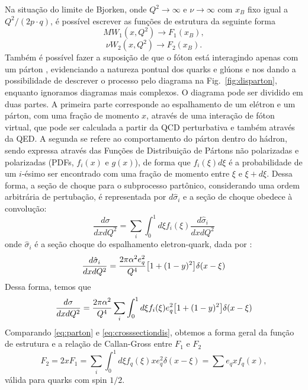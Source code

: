 Na situação do limite de Bjorken, onde \( Q^2 \rightarrow \infty \) e \( \nu \rightarrow \infty \) com \( x_B \) fixo igual a \( Q^2/(2p \cdot q) \), é possível escrever as funções de estrutura da seguinte forma
\begin{equation}
    MW_1 (x, Q^2)\rightarrow F_1(x_B),
\end{equation}
\begin{equation}
    \nu W_2(x, Q^2) \rightarrow F_2(x_B).
\end{equation}
Também é possível fazer a suposição de que o fóton está interagindo apenas com um párton \cite{bjorken_asymptotic_1969}, 
 evidenciando a natureza pontual dos quarks e glúons e nos dando a possibilidade de descrever o processo pelo diagrama na Fig.~\ref{fig:disparton}, enquanto ignoramos diagramas mais complexos. O diagrama pode ser dividido em duas partes. A primeira parte corresponde ao espalhamento de um elétron e um párton, com uma fração de momento \( x \), através  de uma interação de fóton virtual, que pode ser calculada a partir da  QCD perturbativa e também através da QED. A segunda se refere ao comportamento do párton dentro do hádron, sendo expressa através das Funções de Distribuição de Pártons não polarizadas e polarizadas (PDFs, \( f_i(x) \) e \( g(x) \)), de forma que  $f_i(\xi) d\xi$ é a probabilidade de um $i$-ésimo ser encontrado com uma fração de momento entre $\xi$ e $\xi + d\xi$. Dessa forma, a seção de choque para o subprocesso partônico, considerando uma ordem arbitrária de pertubação, é representada por $d\hat{\sigma}_i$  e a seção de choque obedece à convolução:
\begin{equation}
    \frac{d\sigma}{dxdQ^2}  = \sum_i \int^{1}_{0} d\xi f_i(\xi) \frac{d\hat{\sigma}_i}{dxdQ^2}
\end{equation}
onde $\hat{\sigma}_i$ é a seção choque do espalhamento eletron-quark, dada por :
\begin{equation}
    \frac{d\hat{\sigma}_i}{dxdQ^2}  = \frac{2\pi\alpha^2e_q^2}{Q^4}\qty[1 + (1-y)^2]\delta(x-\xi)
\end{equation}
Dessa forma, temos que
\begin{equation}
    \frac{d\sigma}{dxdQ^2}  = \frac{2\pi\alpha^2}{Q^4}\sum_i \int^{1}_{0} d\xi f_i(\xi) e_q^2  \qty[1 + (1-y)^2]\delta(x-\xi)
    \label{eq:parton}
\end{equation}
Comparando \eqref{eq:parton} e \eqref{eq:crosssectiondis}, obtemos a forma geral da função de estrutura e a relação de Callan-Gross entre $F_1$ e $F_2$
\begin{equation}
    F_2 = 2xF_1 = \sum_i \int^1_0 d\xi f_q(\xi) x e_q^2 \delta(x-\xi) = \sum e_q x f_q(x),
    \label{eq:funcaoestruturapdfs}
\end{equation}
válida para quarks com spin $1/2$.

